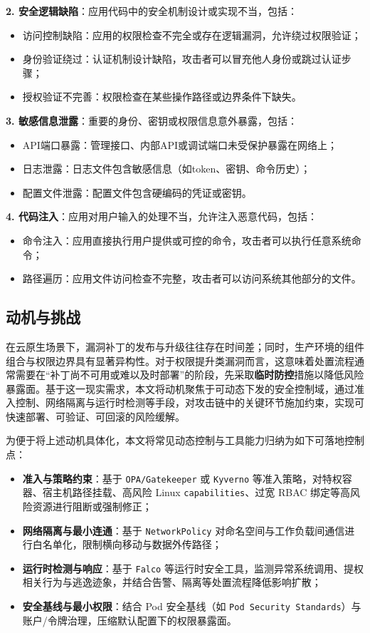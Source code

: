 \textbf{2. 安全逻辑缺陷}：应用代码中的安全机制设计或实现不当，包括：
\begin{itemize}
    \item 访问控制缺陷：应用的权限检查不完全或存在逻辑漏洞，允许绕过权限验证；
    \item 身份验证绕过：认证机制设计缺陷，攻击者可以冒充他人身份或跳过认证步骤；
    \item 授权验证不完善：权限检查在某些操作路径或边界条件下缺失。
\end{itemize}

\textbf{3. 敏感信息泄露}：重要的身份、密钥或权限信息意外暴露，包括：
\begin{itemize}
    \item API端口暴露：管理接口、内部API或调试端口未受保护暴露在网络上；
    \item 日志泄露：日志文件包含敏感信息（如token、密钥、命令历史）；
    \item 配置文件泄露：配置文件包含硬编码的凭证或密钥。
\end{itemize}

\textbf{4. 代码注入}：应用对用户输入的处理不当，允许注入恶意代码，包括：
\begin{itemize}
    \item 命令注入：应用直接执行用户提供或可控的命令，攻击者可以执行任意系统命令；
    \item 路径遍历：应用文件访问检查不完整，攻击者可以访问系统其他部分的文件。
\end{itemize}


\subsection{动机与挑战}

在云原生场景下，漏洞补丁的发布与升级往往存在时间差；同时，生产环境的组件组合与权限边界具有显著异构性。对于权限提升类漏洞而言，这意味着处置流程通常需要在“补丁尚不可用或难以及时部署”的阶段，先采取\textbf{临时防控}措施以降低风险暴露面。基于这一现实需求，本文将动机聚焦于可动态下发的安全控制域，通过准入控制、网络隔离与运行时检测等手段，对攻击链中的关键环节施加约束，实现可快速部署、可验证、可回滚的风险缓解。

为便于将上述动机具体化，本文将常见动态控制与工具能力归纳为如下可落地控制点：
\begin{itemize}
    \item \textbf{准入与策略约束}：基于 \texttt{OPA/Gatekeeper} 或 \texttt{Kyverno} 等准入策略，对特权容器、宿主机路径挂载、高风险 Linux \texttt{capabilities}、过宽 RBAC 绑定等高风险资源进行阻断或强制修正；
    \item \textbf{网络隔离与最小连通}：基于 \texttt{NetworkPolicy} 对命名空间与工作负载间通信进行白名单化，限制横向移动与数据外传路径；
    \item \textbf{运行时检测与响应}：基于 \texttt{Falco} 等运行时安全工具，监测异常系统调用、提权相关行为与逃逸迹象，并结合告警、隔离等处置流程降低影响扩散；
    \item \textbf{安全基线与最小权限}：结合 Pod 安全基线（如 \texttt{Pod Security Standards}）与账户/令牌治理，压缩默认配置下的权限暴露面。
\end{itemize}

